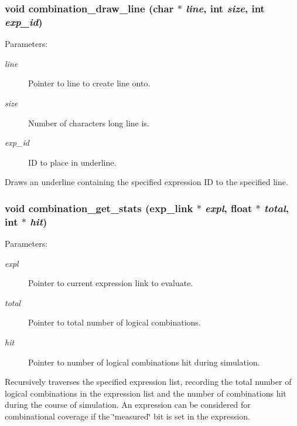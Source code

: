 \subsubsection{\setlength{\rightskip}{0pt plus 5cm}void combination\_\-draw\_\-line (char $\ast$ {\em line}, int {\em size}, int {\em exp\_\-id})}\label{comb_8c_a5}


\begin{Desc}
\item[Parameters: ]\par
\begin{description}
\item[{\em 
line}]Pointer to line to create line onto. \item[{\em 
size}]Number of characters long line is. \item[{\em 
exp\_\-id}]ID to place in underline.\end{description}
\end{Desc}
Draws an underline containing the specified expression ID to the specified line. 
\subsubsection{\setlength{\rightskip}{0pt plus 5cm}void combination\_\-get\_\-stats ({\bf exp\_\-link} $\ast$ {\em expl}, float $\ast$ {\em total}, int $\ast$ {\em hit})}\label{comb_8c_a2}


\begin{Desc}
\item[Parameters: ]\par
\begin{description}
\item[{\em 
expl}]Pointer to current expression link to evaluate. \item[{\em 
total}]Pointer to total number of logical combinations. \item[{\em 
hit}]Pointer to number of logical combinations hit during simulation.\end{description}
\end{Desc}
Recursively traverses the specified expression list, recording the total number of logical combinations in the expression list and the number of combinations hit during the course of simulation. An expression can be considered for combinational coverage if the \char`\"{}measured\char`\"{} bit is set in the expression. 
